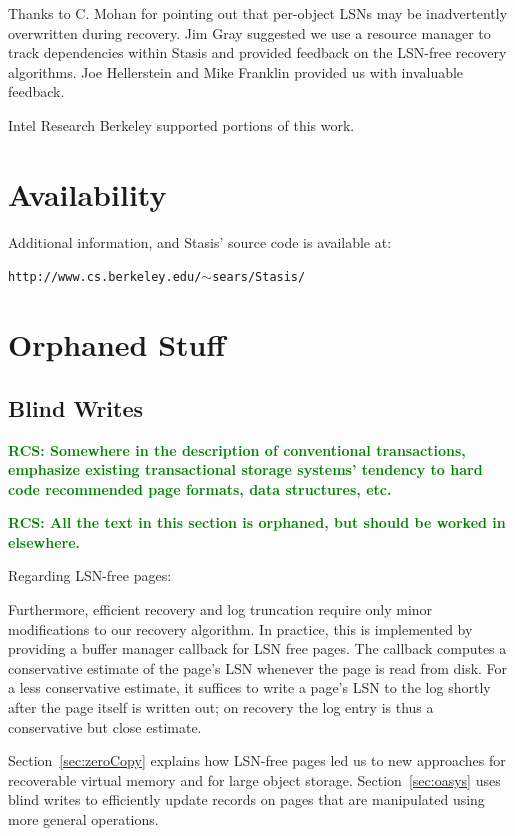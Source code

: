 \documentclass[letterpaper,twocolumn,10pt]{article}
\newcommand{\yad}{Stasis\xspace}
\newcommand{\yads}{Stasis'\xspace}
\newcommand{\rcs}[1]{\textcolor{green}{\bf RCS: #1}}
\begin{document}
Thanks to C. Mohan for pointing out that per-object LSNs may be
inadvertently overwritten during recovery.  Jim Gray suggested we use
a resource manager to track dependencies within \yad and provided
feedback on the LSN-free recovery algorithms.  Joe Hellerstein and
Mike Franklin provided us with invaluable feedback.

Intel Research Berkeley supported portions of this work.

\section{Availability}
\label{sec:avail}

Additional information, and \yads source code is available at:

\begin{center}
{\small{\tt http://www.cs.berkeley.edu/\ensuremath{\sim}sears/\yad/}}
\end{center}

{\footnotesize 
\nocite{*}
}

\theendnotes
\section{Orphaned Stuff}

\subsection{Blind Writes}
\label{sec:blindWrites}
\rcs{Somewhere in the description of conventional transactions, emphasize existing transactional storage systems' tendency to hard code recommended page formats, data structures, etc.}

\rcs{All the text in this section is orphaned, but should be worked in elsewhere.}

Regarding LSN-free pages:

Furthermore, efficient recovery and
log truncation require only minor modifications to our recovery
algorithm.  In practice, this is implemented by providing a buffer manager callback
for LSN free pages.  The callback computes a
conservative estimate of the page's LSN whenever the page is read from disk.
For a less conservative estimate, it suffices to write a page's LSN to
the log shortly after the page itself is written out; on recovery the
log entry is thus a conservative but close estimate.

Section~\ref{sec:zeroCopy} explains how LSN-free pages led us to new 
approaches for recoverable virtual memory and for large object storage.  
Section~\ref{sec:oasys} uses blind writes to efficiently update records 
on pages that are manipulated using more general operations.  
\end{document}
